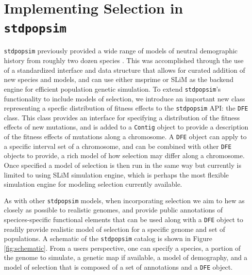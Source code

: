 \documentclass[hidelinks]{article}
\newcommand{\stdpopsim}{\texttt{stdpopsim}\xspace}
\begin{document}
\section*{Implementing Selection in \stdpopsim}
    \label{selection}

    \stdpopsim previously provided a wide range of models of neutral
    demographic history from roughly two dozen species \citep{lauterbur2023expanding}.
    This was accomplished through the use of a standardized interface
    and data structure that allows for curated addition of new
    species and models, and can use either
    msprime \citep{Baumdicker2022} or SLiM \citep{haller2019slim}
    as the backend engine for efficient population genetic simulation.
    To extend \stdpopsim's functionality to include models of selection, 
    we introduce an important new class representing a specfic distribution of fitness effects
    to the \stdpopsim API: the \texttt{DFE} class. 
    This class provides an interface for specifying
    a distribution of the fitness effects of new mutations, and
    is added to a \texttt{Contig} object to provide a description
    of the fitness effects of mutations along a chromosome.
    A \texttt{DFE} object can apply to a specific interval set of a chromosome,
    and can be combined with other \texttt{DFE} objects to provide, 
    a rich model of how selection may differ along a chromosome. 
    Once specified a model of selection is then run in the same way
    but currently is limited to using SLiM simulation engine, which
    is perhaps the most flexible simulation engine for modeling selection currently available.
    

    As with other \stdpopsim models, when incorporating selection we aim to hew as closely as possible
    to realistic genomes, and provide public annotations of specices-specific functional
    elements that can be used along with a \texttt{DFE} object to
    readily provide realistic model of selection for a specific genome and set of
    populations. A schematic of the \stdpopsim catalog is shown in Figure \ref{fig:schematic}.
    From a users perspective, one can specify a species, a portion of the genome to simulate,
    a genetic map if available, a model of demography, and a model of selection that is
    composed of a set of annotations and a \texttt{DFE} object. 
\end{document}
